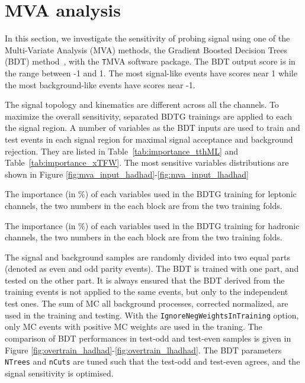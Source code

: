 \section{MVA analysis}
\label{sec:mva}

In this section, we investigate the sensitivity of probing signal using one of the Multi-Variate Analysis (MVA) methods, the Gradient Boosted Decision Trees (BDT) method~\cite{BDT,BDT2}, with the {\texttt TMVA} software package. The BDT output score is in the range between -1 and 1. The most signal-like events have scores near 1 while the most background-like events have scores near -1.

The signal topology and kinematics are different across all the channels. To maximize the overall sensitivity, separated BDTG trainings are applied to each the signal region. A number of variables as the BDT inputs are used to train and test events in each signal region for maximal signal acceptance and background rejection. They are listed in Table~\ref{tab:importance_tthML} and Table~\ref{tab:importance_xTFW}. The most sensitive variables distributions are shown in Figure \ref{fig:mva_input_hadhad}-\ref{fig:mva_input_lhadhad}

\begin{table}
\caption{The importance (in \%) of each variables used in the BDTG training for leptonic channels, the two numbers in the each block are from the two training folds.}
\label{tab:importance_tthML}

\end{table}


\begin{table}
\caption{The importance (in \%) of each variables used in the BDTG training for hadronic channels, the two numbers in the each block are from the two training folds.}
\label{tab:importance_xTFW}

\end{table}

The signal and background samples are randomly divided into two equal parts (denoted as even and odd parity events). The BDT is trained with one part, and tested on the other part. It is always ensured that the BDT derived from the training events is not applied to the same events, but only to the independent test ones. The sum of MC all background processes, corrected normalized, are used in the training and testing. %
With the \texttt{IgnoreNegWeightsInTraining} option, only MC events with positive MC weights are used in the traning. The comparison of BDT performances in test-odd and test-even samples is given in Figure \ref{fig:overtrain_hadhad}-\ref{fig:overtrain_lhadhad}. The BDT parameters \texttt{NTrees} and \texttt{nCuts} are tuned such that the test-odd and test-even agrees, and the signal sensitivity is optimised.

